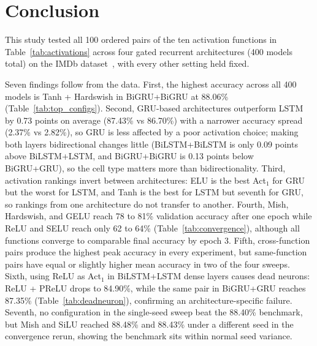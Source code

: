 \documentclass[conference]{IEEEtran}
\begin{document}
\begin{table}[htbp]
  \caption{ReLU as Act$_1$: Effect of Different Act$_2$ Choices}
  \label{tab:deadneuron}
  \centering\footnotesize
  \setlength{\tabcolsep}{3pt}
  \renewcommand{\arraystretch}{1.08}
\end{table}

\FloatBarrier


\section{Conclusion}

This study tested all 100 ordered pairs of the ten activation
functions in Table~\ref{tab:activations} across four gated recurrent architectures
(400 models total) on the IMDb dataset~\cite{maas2011}, with every other
setting held fixed.

Seven findings follow from the data. First, the highest
accuracy across all 400 models is Tanh + Hardswish in
BiGRU+BiGRU at 88.06\% (Table~\ref{tab:top_configs}). Second, GRU-based
architectures outperform LSTM by 0.73 points on average
(87.43\% vs 86.70\%) with a narrower accuracy spread (2.37\%
vs 2.82\%), so GRU is less affected by a poor activation
choice; making both layers bidirectional changes little (BiLSTM+BiLSTM
is only 0.09 points above BiLSTM+LSTM, and
BiGRU+BiGRU is 0.13 points below BiGRU+GRU), so the
cell type matters more than bidirectionality. Third, activation
rankings invert between architectures: ELU is the best Act$_1$ for
GRU but the worst for LSTM, and Tanh is the best for LSTM
but seventh for GRU, so rankings from one architecture do
not transfer to another. Fourth, Mish, Hardswish, and GELU
reach 78 to 81\% validation accuracy after one epoch while
ReLU and SELU reach only 62 to 64\% (Table~\ref{tab:convergence}), although
all functions converge to comparable final accuracy by epoch 3.
Fifth, cross-function pairs produce the highest peak accuracy in
every experiment, but same-function pairs have equal or slightly
higher mean accuracy in two of the four sweeps. Sixth, using
ReLU as Act$_1$ in BiLSTM+LSTM dense layers causes dead
neurons: ReLU + PReLU drops to 84.90\%, while the same
pair in BiGRU+GRU reaches 87.35\% (Table~\ref{tab:deadneuron}), confirming
an architecture-specific failure. Seventh, no configuration in
the single-seed sweep beat the 88.40\% benchmark, but Mish
and SiLU reached 88.48\% and 88.43\% under a different seed
in the convergence rerun, showing the benchmark sits within
normal seed variance.
\end{document}
